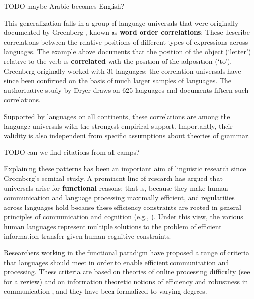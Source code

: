 \documentclass[9pt,twocolumn,twoside,lineno]{pnas-new}
\newcommand{\key}[1]{\textbf{#1}}
\begin{document}
TODO maybe Arabic becomes English?



This generalization falls in a group of language universals that were originally documented by Greenberg \cite{greenberg1963universals}, known as \key{word order correlations}:
These describe correlations between the relative positions of different types of expressions across languages.
The example above documents that the position of the object (`letter') relative to the verb is \key{correlated} with the position of the adposition (`to'). %
Greenberg originally worked with 30 languages; the correlation universals have since been confirmed on the basis of much larger samples of languages.
The authoritative study by Dryer \cite{dryer1992greenbergian} draws on 625 languages and documents fifteen such correlations.




Supported by languages on all continents, these correlations are among the language universals with the strongest empirical support.
Importantly, their validity is also independent from specific assumptions about theories of grammar.


TODO can we find citations from all camps?

Explaining these patterns has been an important aim of linguistic research since Greenberg's seminal study.
A prominent line of research has argued that universals arise for \key{functional} reasons: that is, because they make human communication and language processing maximally efficient, and regularities across languages hold because these efficiency constraints are rooted in general principles of communication and cognition (e.g., \cite{gabelentz1901sprachwissenschaft,zipf1949human,hockett1960origin,givon1991markedness,hawkins1994performance,hawkins2004efficiency,hawkins2014crosslinguistic,croft2001functional,haspelmath2008parametric,jaeger2011language}).
Under this view, the various human languages represent multiple solutions to the problem of efficient information transfer given human cognitive constraints.

Researchers working in the functional paradigm have proposed a range of criteria that languages should meet in order to enable efficient communication and processing. These criteria are based on theories of online processing difficulty (see \cite{jaeger2011language} for a review) and on information theoretic notions of efficiency and robustness in communication \cite{ferrericancho2001two,piantadosi2011word,gibson2013noisy}, and they have been formalized to varying degrees. 
\end{document}
